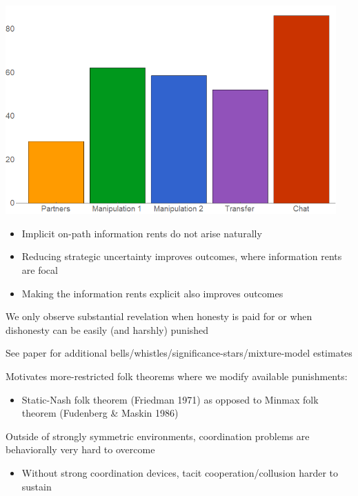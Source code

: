 \documentclass{beamer}
\begin{document}
\begin{frame}
\begin{card}
    \begin{center}
    \includegraphics[width=0.95\textwidth]{./i/EffManip.png}
    \end{center}
\end{card}
\end{frame}

\begin{frame}
\begin{card}
\begin{itemize}
    \item Implicit on-path information rents do not arise naturally
    \item Reducing strategic uncertainty improves outcomes, where information rents are focal
    \item Making the information rents explicit also improves outcomes
\end{itemize}
We only observe substantial revelation when honesty is paid for or
when dishonesty can be easily (and harshly) punished
\end{card}
\begin{card}
See paper for additional bells/whistles/significance-stars/mixture-model
estimates
\end{card}
\end{frame}

\begin{frame}
\begin{card}[Coordination]
Motivates more-restricted folk theorems where we modify available
punishments:
    \begin{itemize}
    \item Static-Nash folk theorem (Friedman 1971) as opposed to Minmax folk
    theorem (Fudenberg \& Maskin 1986)
    \end{itemize}
Outside of strongly symmetric environments, coordination problems are behaviorally very hard to overcome
    \begin{itemize}
    \item Without strong coordination devices, tacit cooperation/collusion harder to sustain
    \end{itemize}
\end{card}
\end{frame}
\end{document}
